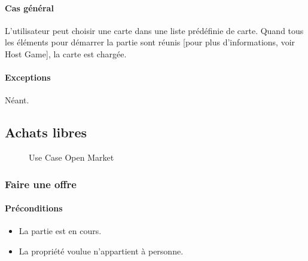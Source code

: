 \documentclass[a4paper,11pt]{report}
\begin{document}
\paragraph{Cas général}
L'utilisateur peut choisir une carte dans une liste prédéfinie de carte. Quand tous les éléments pour démarrer la partie
sont réunis [pour plus d'informations, voir Host Game], la carte est chargée.
\paragraph{Exceptions} Néant.

\newpage
\subsection{Achats libres}
\begin{figure}[ht]
    \caption{Use Case Open Market}
\end{figure}
\subsubsection{Faire une offre}
\paragraph{Préconditions}
\begin{itemize}
 \item La partie est en cours.
 \item La propriété voulue n'appartient à personne.
\end{itemize}
\end{document}
